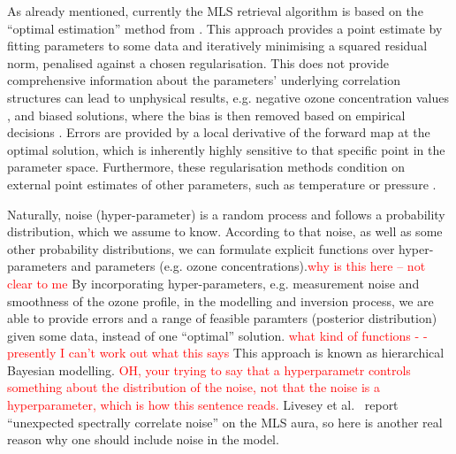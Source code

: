 As already mentioned, currently the MLS retrieval algorithm \cite{livesey2006retrieval} is based on the ``optimal estimation'' method from \cite{rodgers1976retrieval}.
This approach provides a point estimate by fitting parameters to some data and iteratively minimising a squared residual norm, penalised against a chosen regularisation.
This does not provide comprehensive information about the parameters' underlying correlation structures can lead to unphysical results, e.g. negative ozone concentration values \cite{MLSdata}, and biased solutions, where the bias is then removed based on empirical decisions \cite{livesey2008ozonecarbonmono, Froidevaux2008snrozone}.
Errors are provided by a local derivative of the forward map at the optimal solution, which is inherently highly sensitive to that specific point in the parameter space.
Furthermore, these regularisation methods condition on external point estimates of other parameters, such as temperature or pressure \cite{livesey2006retrieval}.

Naturally, noise (hyper-parameter) is a random process and follows a probability distribution, which we assume to know.
According to that noise, as well as some other probability distributions, we can formulate explicit functions over hyper-parameters and parameters (e.g. ozone concentrations).\textcolor{red}{why is this here -- not clear to me}
By incorporating hyper-parameters, e.g. measurement noise and smoothness of the ozone profile, in the modelling and inversion process, we are able to provide errors and a range of feasible paramters (posterior distribution) given some data, instead of one ``optimal'' solution.\textcolor{red}{ what kind of functions - -presently I can't work out what this says}
This approach is known as hierarchical Bayesian modelling.\textcolor{red}{  OH, your trying to say that a hyperparametr controls something about the distribution of the noise, not that the noise is a hyperparameter, which is how this sentence reads.}
Livesey et al.~\cite{livesey2006retrieval} report ``unexpected spectrally correlate noise'' on the MLS aura, so here is another real reason why one should include noise in the model.


